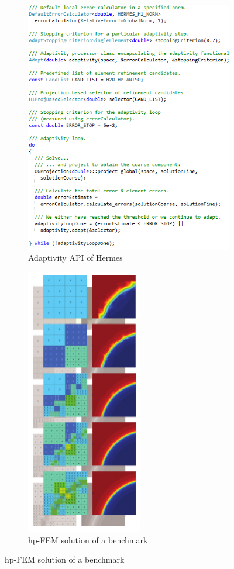 \documentclass{beamer}
\begin{document}
\begin{frame}
\begin{figure}[H]
		\centering
		\begin{subfigure}{0.49\textwidth}
			\centering
			\includegraphics[width=.85\textwidth]{codeimg/adapt.png}
			\caption{Adaptivity API of Hermes}
		\end{subfigure}
		\begin{subfigure}{.49\textwidth}
		\centering
			\includegraphics[width=.4\textwidth]{outputs/poster.png}
			\caption{hp-FEM solution of a benchmark}
		\end{subfigure}
	\end{figure}
\end{frame}
\end{document}
